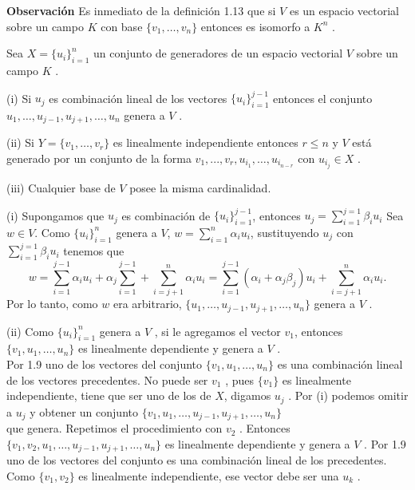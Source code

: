   	 \textbf{Observación} Es inmediato de la definición 1.13 que si $ V $ es un espacio vectorial sobre un campo $ K $ con base $ \{v_{1} , \ldots , v_{n} \} $ entonces es isomorfo a $ K^{ n} $ .
  	 \begin{teo}
  	 	Sea $ X = \{u_{i}\}^{n}_{i=1}$ un conjunto de generadores de un espacio vectorial $ V $ sobre un campo $ K $ .
  	 	
  	 	(i) Si $ u_{j} $ es combinación lineal de los vectores $ \{u_{i}\}^{j-1}_{i=1} $ entonces el conjunto $ {u_{1} , \ldots, u_{j-1} , u_{j+1} , \ldots , u_{n} } $ genera a $ V $ .
  	 	
  	 	(ii) Si $ Y = \{v_{1} , \ldots , v_{r} \} $ es linealmente independiente entonces $  r \leq n $ y $ V $ está generado por un conjunto de la forma $ {v_{1}, . . . , v_{r} , u_{i_{1}} , \ldots , u_{i_{n-r}} } $ con $ u_{i_{j}} \in X $ .
  	 	
  	 	(iii) Cualquier base de $ V $ posee la misma cardinalidad.
  	 \end{teo}
   	\begin{demo}
   		 (i) Supongamos que $ u_{j} $ es combinación de $ \{u_{i} \}^{j-1}_{i=1} $, entonces $ u_{j} = \sum_{i=1}^{j=1} \beta_{i} u_{i} $ Sea $ w \in V $. Como $ \{u_{i}\}^{n}_{i=1} $ genera a $ V $, $ w = \sum_{i=1}^{n} \alpha_{i} u_{i}$, sustituyendo $ u_{j} $ con $   \sum_{i=1}^{j=1} \beta_{i} u_{i} $ tenemos que 
   		 \[ w =  \sum_{i=1}^{j-1}\alpha_{i}u_{i}+\alpha_{j}\sum_{i=1}^{j-1}+\sum_{i=j+1}^{n}\alpha_{i}u_{i} = \sum_{i=1}^{j-1}(\alpha_{i}+\alpha_{j}\beta_{j})u_{i}+\sum_{i=j+1}^{n}\alpha_{i}u_{i}. \]
   		 Por lo tanto, como $ w $ era arbitrario, $ \{u_{1} , \ldots , u_{j-1} , u_{j+1}, \ldots , u_{n}\} $ genera a $ V $ .
   	\end{demo}
   (ii) Como $ \{u_{i}\}^{n}_{i=1} $ genera a $ V $ , si le agregamos el vector $ v_{1} $, entonces
   $ \{v_{1} , u_{1}, \ldots , u_{n} \} $ es linealmente dependiente y genera a $ V $ .\\
   Por 1.9 uno de los vectores del conjunto $ \{v_{1} , u_{1} ,\ldots , u_{n}\} $ es una combinación lineal de los vectores precedentes. No puede ser $ v_{1} $ , pues $ \{v_{1}\} $ es linealmente independiente, tiene que ser uno de los de $ X $, digamos $ u_{j} $ . Por (i) podemos omitir a $ u_{j} $
   y obtener un conjunto $ \{v_{1}, u_{1} , \ldots , u_{j-1} , u_{j+1},\ldots , u_{n}\}  $ \\ que genera. Repetimos el procedimiento con $ v_{2} $ . Entonces $ \{v_{1} , v_{2} , u_{1}, \ldots , u_{j-1} , u_{j+1} , \ldots , u_{n} \} $ es linealmente dependiente y genera a $ V $ . Por 1.9 uno de los vectores del conjunto es una combinación lineal de los precedentes. Como $  \{v_{1} , v_{2} \} $ es linealmente independiente, ese vector debe ser una $ u_{k} $ . 
